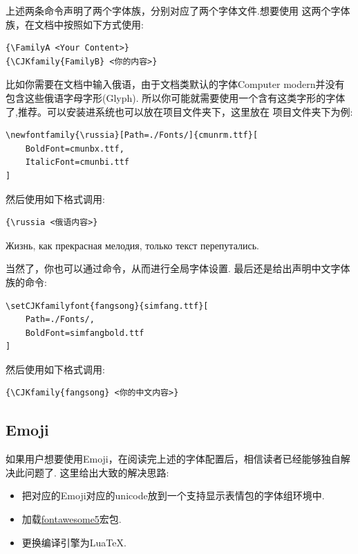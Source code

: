 上述两条命令声明了两个字体族，分别对应了两个字体文件.想要使用
这两个字体族，在文档中按照如下方式使用:
\begin{verbatim}
{\FamilyA <Your Content>}
{\CJKfamily{FamilyB} <你的内容>}
\end{verbatim}

比如你需要在文档中输入俄语，由于文档类默认的字体Computer modern并没有包含这些俄语字母字形(Glyph).
所以你可能就需要使用一个含有这类字形的字体了,推荐。可以安装进系统也可以放在项目文件夹下，这里放在
项目文件夹下为例:
\begin{verbatim}
\newfontfamily{\russia}[Path=./Fonts/]{cmunrm.ttf}[
    BoldFont=cmunbx.ttf,
    ItalicFont=cmunbi.ttf
]
\end{verbatim}

然后使用如下格式调用:
\begin{verbatim}
{\russia <俄语内容>}
\end{verbatim}

\begin{leftbar}
{\russia Жизнь, как прекрасная мелодия, только текст перепутались.}\par 
{}
\end{leftbar}


当然了，你也可以通过\cmd{\setmainfont}命令，从而进行全局字体设置. 最后还是给出声明中文字体族的命令:
\begin{verbatim}
\setCJKfamilyfont{fangsong}{simfang.ttf}[
    Path=./Fonts/,
    BoldFont=simfangbold.ttf
]
\end{verbatim}

然后使用如下格式调用:
\begin{verbatim}
{\CJKfamily{fangsong} <你的中文内容>}
\end{verbatim}

\subsection{Emoji}
如果用户想要使用Emoji，在阅读完上述的字体配置后，相信读者已经能够独自解决此问题了. 这里给出大致的解决思路:
\begin{itemize}
    \item 把对应的Emoji对应的unicode放到一个支持显示表情包的字体组环境中.
    \item 加载\href{http://mirrors.ctan.org/fonts/fontawesome5/doc/fontawesome5.pdf}{fontawesome5}宏包.
    \item 更换编译引擎为Lua\TeX.
\end{itemize}


